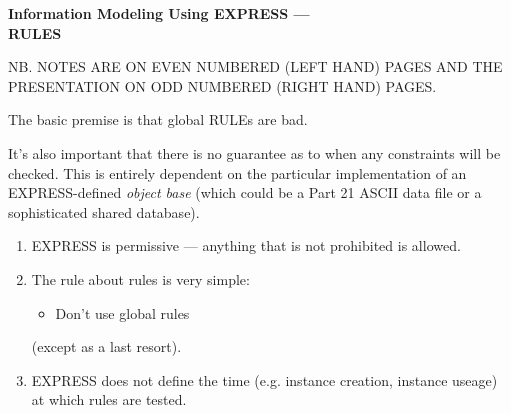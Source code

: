 

%


\pagestyle{empty}
\bodsiz

\vspace*{\beftit}
\begin{center}
{\titsiz \bfseries Information Modeling Using EXPRESS --- \\ RULES}
\end{center}
\vspace{\beftit}
\vspace{\beftit}
\begin{center}
\end{center}

\clearpage
\ifnotes
  \pagestyle{plain}
\else
  \pagestyle{empty}
\fi

\begin{remarks}
\remintro
NB. NOTES ARE ON EVEN NUMBERED (LEFT HAND) PAGES AND THE PRESENTATION ON
ODD NUMBERED (RIGHT HAND) PAGES.


    The basic premise is that global RULEs are bad.

    It's also important that there is no guarantee as to when
any constraints will be checked. This is entirely dependent on
the particular implementation of an EXPRESS-defined 
\emph{object base} (which could be a Part 21 ASCII data file or a
sophisticated shared database).

\remend
\end{remarks}


\begin{enumerate}

\item EXPRESS is permissive --- anything that is not prohibited is allowed.

\item The rule about rules is very simple:

\begin{itemize}
\item Don't use global rules
\end{itemize}

(except as a last resort).

\item EXPRESS does not define the time (e.g. instance creation, 
instance useage) at which rules are tested.

\end{enumerate}

